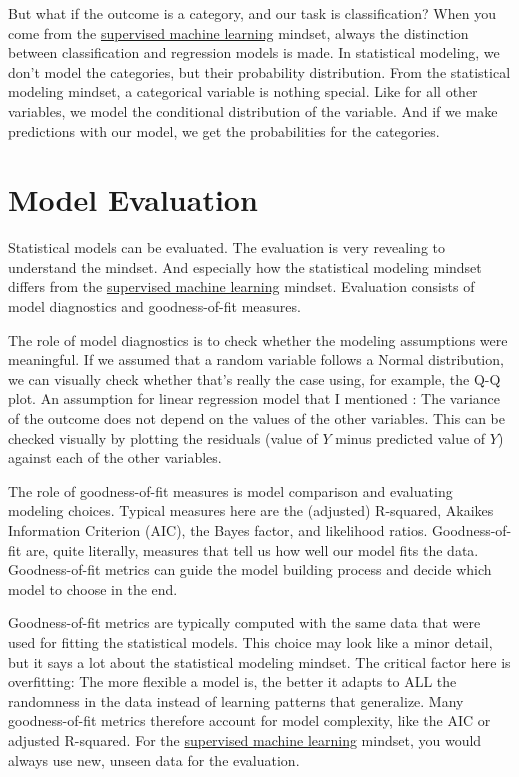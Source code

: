 \documentclass[
  10pt,
]{scrbook}
\begin{document}
But what if the outcome is a category, and our task is classification?
When you come from the \protect\hyperlink{supervised-ml}{supervised machine learning} mindset, always the distinction between classification and regression models is made.
In statistical modeling, we don't model the categories, but their probability distribution.
From the statistical modeling mindset, a categorical variable is nothing special.
Like for all other variables, we model the conditional distribution of the variable.
And if we make predictions with our model, we get the probabilities for the categories.

\hypertarget{model-evaluation}{%
\section{Model Evaluation}\label{model-evaluation}}

Statistical models can be evaluated.
The evaluation is very revealing to understand the mindset.
And especially how the statistical modeling mindset differs from the \protect\hyperlink{supervised-ml}{supervised machine learning} mindset.
Evaluation consists of model diagnostics and goodness-of-fit measures.

The role of model diagnostics is to check whether the modeling assumptions were meaningful.
If we assumed that a random variable follows a Normal distribution, we can visually check whether that's really the case using, for example, the Q-Q plot.
An assumption for linear regression model that I mentioned : The variance of the outcome does not depend on the values of the other variables.
This can be checked visually by plotting the residuals (value of \(Y\) minus predicted value of \(Y\)) against each of the other variables.

The role of goodness-of-fit measures is model comparison and evaluating modeling choices.
Typical measures here are the (adjusted) R-squared, Akaikes Information Criterion (AIC), the Bayes factor, and likelihood ratios.
Goodness-of-fit are, quite literally, measures that tell us how well our model fits the data.
Goodness-of-fit metrics can guide the model building process and decide which model to choose in the end.

Goodness-of-fit metrics are typically computed with the same data that were used for fitting the statistical models.
This choice may look like a minor detail, but it says a lot about the statistical modeling mindset.
The critical factor here is overfitting: The more flexible a model is, the better it adapts to ALL the randomness in the data instead of learning patterns that generalize.
Many goodness-of-fit metrics therefore account for model complexity, like the AIC or adjusted R-squared.
For the \protect\hyperlink{supervised-ml}{supervised machine learning} mindset, you would always use new, unseen data for the evaluation.
\end{document}
